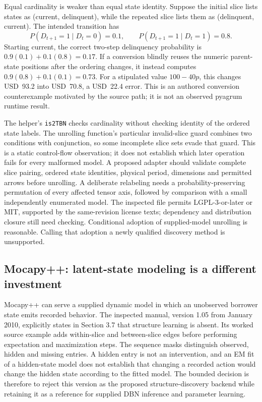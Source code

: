 Equal cardinality is weaker than equal state identity. Suppose the initial
slice lists states as (current, delinquent), while the repeated slice lists
them as (delinquent, current). The intended transition has
\[
 P(D_{t+1}=1\mid D_t=0)=0.1,\qquad
 P(D_{t+1}=1\mid D_t=1)=0.8.
\]
Starting current, the correct two-step delinquency probability is
$0.9(0.1)+0.1(0.8)=0.17$. If a conversion blindly reuses the numeric
parent-state positions after the ordering changes, it instead computes
$0.9(0.8)+0.1(0.1)=0.73$. For a stipulated value $100-40p$, this changes
USD~93.2 into USD~70.8, a USD~22.4 error. This is an authored conversion
counterexample motivated by the source path; it is not an observed pyagrum
runtime result. \citep{exec16_ct_oracle}

The helper's \texttt{is2TBN} checks cardinality without checking identity of
the ordered state labels. The unrolling function's particular invalid-slice
guard combines two conditions with conjunction, so some incomplete slice
sets evade that guard. This is a static control-flow observation; it does not
establish which later operation fails for every malformed model. A proposed
adapter should validate complete slice pairing, ordered state identities,
physical period, dimensions and permitted arrows before unrolling. A
deliberate relabeling needs a probability-preserving permutation of every
affected tensor axis, followed by comparison with a small independently
enumerated model. The inspected file permits LGPL-3-or-later or MIT, supported
by the same-revision license texts; dependency and distribution closure still
need checking. Conditional adoption of supplied-model unrolling is reasonable.
Calling that adoption a newly qualified discovery method is unsupported.
\citep{exec16_ct_agrum,exec16_ct_design}

\subsection{Mocapy++: latent-state modeling is a different investment}

Mocapy++ can serve a supplied dynamic model in which an unobserved borrower
state emits recorded behavior. The inspected manual, version 1.05 from January
2010, explicitly states in Section 3.7 that structure learning is absent.
Its worked source example adds within-slice and between-slice edges before
performing expectation and maximization steps. The sequence masks distinguish
observed, hidden and missing entries. A hidden entry is not an intervention,
and an EM fit of a hidden-state model does not establish that changing a
recorded action would change the hidden state according to the fitted model.
The bounded decision is therefore to reject this version as the proposed
structure-discovery backend while retaining it as a reference for supplied
DBN inference and parameter learning. \citep{exec16_ct_mocapy}

